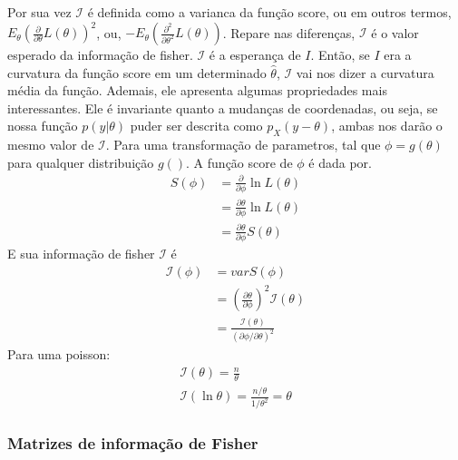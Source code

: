 Por sua vez \(\mathcal{I} \) é definida como a varianca da função score, ou em outros termos,
\(E_{\theta }(\frac{\partial }{\partial \theta } L(\theta ))^{2}\), ou, \(-E_{\theta }(\frac{\partial^{2}  }{\partial \theta^{2}  } L(\theta ))\).
Repare nas diferenças, \(\mathcal{I} \) é o valor esperado da informação de fisher. \(\mathcal{I} \)
é a esperança de \(I\). Então, se \(I\) era a curvatura da função score em um determinado
\(\hat{\theta} \), \(\mathcal{I}\) vai nos dizer a curvatura média da função. Ademais, ele apresenta
algumas propriedades mais interessantes. Ele é invariante quanto a mudanças de coordenadas, ou seja,
se nossa função \(p(y|\theta )\) puder ser descrita como \(p_X(y-\theta)\), ambas nos darão o mesmo
valor de \(\mathcal{I} \). Para uma transformação de parametros, tal que \(\phi =g(\theta)\) para
qualquer distribuição \(g()\). A função score de \(\phi \) é dada por.
\begin{align}
    S(\phi)&=\frac{\partial }{\partial \phi }\ln  L(\theta )\\
    &=\frac{\partial \theta }{\partial \phi } \ln  L(\theta )\\
    &=\frac{\partial \theta }{\partial \phi }S(\theta)
\end{align}
E sua informação de fisher \(\mathcal{I} \) é
\begin{align}
    \mathcal{I} (\phi )&=varS(\phi )\\
    &=(\frac{\partial \theta  }{\partial \phi  })^{2} \mathcal{I}(\theta)\\
    &=\frac{\mathcal{I}(\theta)}{(\partial \phi /\partial \theta )^{2}}
\end{align}
Para uma poisson:
\begin{align*}
    \mathcal{I} (\theta)=\frac{n}{\theta  }\\
    \mathcal{I} (\ln \theta )=\frac{n/\theta }{1/\theta^{2} }=\theta
\end{align*}

\subsubsection{Matrizes de informação de Fisher}

